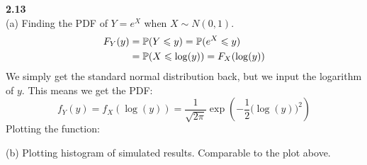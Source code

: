\newpage\noindent
\textbf{2.13}\\  %
(a) Finding the PDF of $Y = e^X$ when $X\sim N(0,1)$.
\begin{align*}
    F_Y(y) &= \P(Y\leq y) = \P(e^X \leq y) \\
    &= \P(X\leq \log(y)) = F_X(\log(y))
\end{align*}
We simply get the standard normal distribution back, but we input the logarithm of $y$.
This means we get the PDF:
$$
f_Y(y) = f_X(\log(y)) = \frac{1}{\sqrt{2\pi}}\exp\left(-\frac{1}{2}\big(\log(y)\big)^2\right)
$$
Plotting the function:
\begin{figure}[H]
\begin{minipage}{0.5\textwidth}
\end{minipage}
\begin{minipage}{0.5\textwidth}
\end{minipage}
\end{figure}
(b) Plotting histogram of simulated results. Comparable to the plot above.
